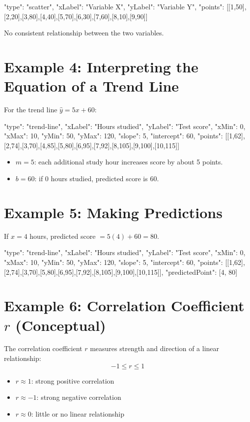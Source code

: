\documentclass[14pt]{extarticle}
\begin{document}
\begin{diagramdata}
{
  "type": "scatter",
  "xLabel": "Variable X",
  "yLabel": "Variable Y",
  "points": [[1,50],[2,20],[3,80],[4,40],[5,70],[6,30],[7,60],[8,10],[9,90]]
}
\end{diagramdata}

No consistent relationship between the two variables.

\section*{Example 4: Interpreting the Equation of a Trend Line}

For the trend line \(\hat{y} = 5x + 60\):

\begin{diagramdata}
{
  "type": "trend-line",
  "xLabel": "Hours studied",
  "yLabel": "Test score",
  "xMin": 0,
  "xMax": 10,
  "yMin": 50,
  "yMax": 120,
  "slope": 5,
  "intercept": 60,
  "points": [[1,62],[2,74],[3,70],[4,85],[5,80],[6,95],[7,92],[8,105],[9,100],[10,115]]
}
\end{diagramdata}

\begin{itemize}
  \item \(m = 5\): each additional study hour increases score by about 5 points.
  \item \(b = 60\): if 0 hours studied, predicted score is 60.
\end{itemize}

\section*{Example 5: Making Predictions}

If \(x = 4\) hours, predicted score \(= 5(4)+60=80\).

\begin{diagramdata}
{
  "type": "trend-line",
  "xLabel": "Hours studied",
  "yLabel": "Test score",
  "xMin": 0,
  "xMax": 10,
  "yMin": 50,
  "yMax": 120,
  "slope": 5,
  "intercept": 60,
  "points": [[1,62],[2,74],[3,70],[5,80],[6,95],[7,92],[8,105],[9,100],[10,115]],
  "predictedPoint": [4, 80]
}
\end{diagramdata}

\section*{Example 6: Correlation Coefficient \(r\) (Conceptual)}

The correlation coefficient \(r\) measures strength and direction of a linear relationship:
\[
-1 \le r \le 1
\]
\begin{itemize}
  \item \(r \approx 1\): strong positive correlation
  \item \(r \approx -1\): strong negative correlation
  \item \(r \approx 0\): little or no linear relationship
\end{itemize}
\end{document}
